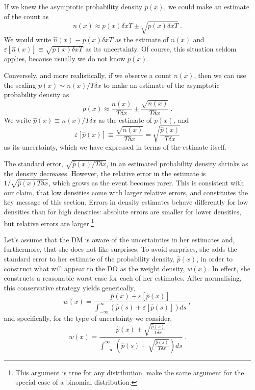 \documentclass[12pt,letter,timesnewroman]{article}
\newcommand{\elabel}[1]{\label{eq:#1}}
\newcommand{\be}{\begin{equation}}
\newcommand{\ee}{\end{equation}}
\newcommand{\err}[1]{\varepsilon\left[#1\right]}
\newcommand{\phat}{\hat{p}}
\newcommand{\nhat}{\hat{n}}
\begin{document}
If we knew the asymptotic probability density $p(x)$, we could make an estimate of the count as
\be
n(x) \approx p(x) \delta x T \pm \sqrt{p(x) \delta x T} ~.
\elabel{count_est}
\ee
We would write $\nhat(x) \equiv p(x) \delta x T$ as the estimate of $n(x)$ and $\err{\nhat(x)} \equiv \sqrt{p(x) \delta x T}$ as its uncertainty. Of course, this situation seldom applies, because usually we do not know $p(x)$.

Conversely, and more realistically, if we observe a count $n(x)$, then we can use the scaling $ p(x) \sim n(x)/T\delta x$ to make an estimate of the asymptotic probability density as
\be
p(x) \approx \frac{n(x)}{T\delta x} \pm \frac{\sqrt{n(x)}}{T \delta x} ~.
\elabel{prob_est}
\ee
We write $\phat(x) \equiv n(x)/T\delta x$ as the estimate of $p(x)$, and
\be
\err{\phat(x)} \equiv \frac{\sqrt{n(x)}}{T \delta x} = \sqrt{\frac{\phat(x)}{T \delta x}}
\ee
as its uncertainty, which we have expressed in terms of the estimate itself.

The standard error, $ \sqrt{\phat(x)/T \delta x}$, in an estimated probability density shrinks as the density decreases. However, the relative error in the estimate is $1/\sqrt{\phat(x)T\delta x}$, which grows as the event becomes rarer. This is consistent with our claim, that low densities come with larger relative errors, and constitutes the key message of this section. Errors in density estimates behave differently for low densities than for high densities: absolute errors are smaller for lower densities, but relative errors are larger.\footnote{This argument is true for any distribution. \textcite[537-8]{HertwigETAL2004} make the same argument for the special case of a binomial distribution.}

Let's assume that the DM is aware of the uncertainties in her estimates and, furthermore, that she does not like surprises. To avoid surprises, she adds the standard error to her estimate of the probability density, $\phat(x)$, in order to construct what will appear to the DO as the weight density, $w(x)$. In effect, she constructs a reasonable worst case for each of her estimates. After normalising, this conservative strategy yields generically,
\be
w(x) = \frac{\phat(x)+\err{\phat(x)}}{\int_{-\infty}^{\infty}\left(\phat(s)+\err{\phat(s)}\right)ds}~,
\elabel{weight_density_gen}
\ee
and specifically, for the type of uncertainty we consider,
\be
w(x)= \frac{\phat(x)+\sqrt{\frac{\phat(x)}{T \delta x}}}{\int_{-\infty}^{\infty}\left(\phat(s)+\sqrt{\frac{\phat(s)}{T \delta x}}\right)ds}~.
\elabel{weight_density_spec}
\ee
\end{document}
